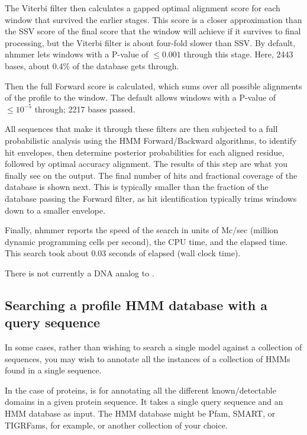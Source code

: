 The Viterbi filter then calculates a gapped optimal alignment score for each
window that survived the earlier stages. This score is a closer approximation
than the SSV score of the final score that the window will achieve if it
survives to final processing, but the Viterbi filter is about four-fold slower
than SSV. By default, nhmmer lets windows with a P-value of $\leq 0.001$ 
through this stage. Here, 2443 bases, about 0.4\% of the database gets through.

Then the full Forward score is calculated, which sums over all
possible alignments of the profile to the window. The default
allows windows with a P-value of $\leq 10^{-5}$ through; 2217 bases
passed.

All sequences that make it through these filters are
then subjected to a full probabilistic analysis using the HMM
Forward/Backward algorithms, to identify hit envelopes, then determine
posterior probabilities for each aligned residue, followed by optimal
accuracy alignment. The results of this step are what you finally see on
the output. The final number of hits and fractional coverage of the 
database is shown next. This is typically smaller than the fraction of the
database passing the Forward filter, as hit identification typically trims
windows down to a smaller envelope.

Finally, nhmmer reports the speed of the search in units of Mc/sec
(million dynamic programming cells per second), the CPU time, and the
elapsed time. This search took about 0.03 seconds of elapsed (wall
clock time). 

There is not currently a DNA analog to . 



\subsection{Searching a profile HMM database with a query sequence}

In some cases, rather than wishing to search a single model against a collection
of sequences, you may wish to annotate all the instances of a collection of HMMs
found in a single sequence.

In the case of proteins,  is for annotating all the different
known/detectable domains in a given protein sequence. It takes a single query
sequence and an HMM database as input. The HMM database might be Pfam,
SMART, or TIGRFams, for example, or another collection of your choice.


